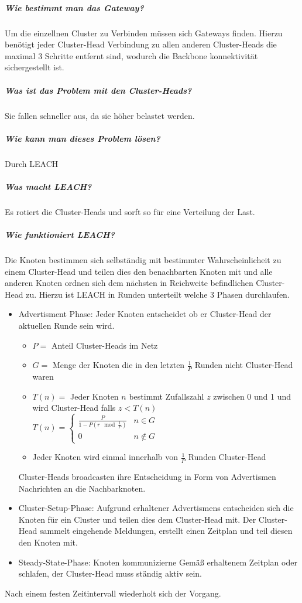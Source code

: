 	\subparagraph{Wie bestimmt man das Gateway?}
	Um die einzellnen Cluster zu Verbinden müssen sich Gateways finden. Hierzu benötigt jeder Cluster-Head Verbindung zu allen anderen Cluster-Heads die maximal 3 Schritte entfernt sind, wodurch die Backbone konnektivität sichergestellt ist.
	
	\subparagraph{Was ist das Problem mit den Cluster-Heads?}
	Sie fallen schneller aus, da sie höher belastet werden.
	
	\subparagraph{Wie kann man dieses Problem lösen?}
	Durch LEACH
	
	\subparagraph{Was macht LEACH?}
	Es rotiert die Cluster-Heads und sorft so für eine Verteilung der Last.
	
	\subparagraph{Wie funktioniert LEACH?}
	Die Knoten bestimmen sich selbständig mit bestimmter Wahrscheinlicheit zu einem Cluster-Head und teilen dies den benachbarten Knoten mit und alle anderen Knoten ordnen sich dem nächsten in Reichweite befindlichen Cluster-Head zu. Hierzu ist LEACH in Runden unterteilt welche 3 Phasen durchlaufen.
	\begin{itemize}
		\item Advertisment Phase: Jeder Knoten entscheidet ob er Cluster-Head der aktuellen Runde sein wird.
		\begin{itemize}
			\item $P = $ Anteil Cluster-Heads im Netz
			\item $G = $ Menge der Knoten die in den letzten $\frac{1}{P}$ Runden nicht Cluster-Head waren
			\item $T(n) =$ Jeder Knoten $n$ bestimmt Zufallszahl $z$ zwischen 0 und 1 und wird Cluster-Head falls $z < T(n)$ \\
			$T(n)= \begin{cases}
			\frac{P}{1-P(r \mod \frac{1}{P})} & n \in G \\
			0 & n \notin G
			\end{cases}
			$
			\item Jeder Knoten wird einmal innerhalb von $\frac{1}{P}$ Runden Cluster-Head
		\end{itemize}
		Cluster-Heads broadcasten ihre Entscheidung in Form von Advertismen Nachrichten an die Nachbarknoten.
		
		\item Cluster-Setup-Phase: Aufgrund erhaltener Advertismens entscheiden sich die Knoten für ein Cluster und teilen dies dem Cluster-Head mit. Der Cluster-Head sammelt eingehende Meldungen, erstellt einen Zeitplan und teil diesen den Knoten mit.
		
		\item Steady-State-Phase: Knoten kommunizierne Gemäß erhaltenem Zeitplan oder schlafen, der Cluster-Head muss ständig aktiv sein.
	\end{itemize}
	Nach einem festen Zeitintervall wiederholt sich der Vorgang.
	
